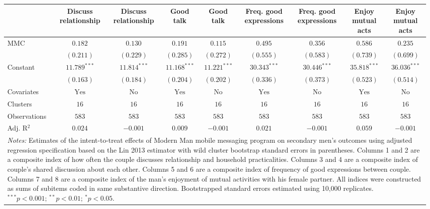 
\begin{tabular}{l c c c c c c c c}
\toprule
 & Discuss relationship & Discuss relationship & Good talk & Good talk & Freq. good expressions & Freq. good expressions & Enjoy mutual acts & Enjoy mutual acts \\
\midrule
MMC          & $0.182$        & $0.130$        & $0.191$        & $0.115$        & $0.495$        & $0.356$        & $0.586$        & $0.235$        \\
             & $(0.211)$      & $(0.229)$      & $(0.285)$      & $(0.272)$      & $(0.555)$      & $(0.583)$      & $(0.739)$      & $(0.699)$      \\
Constant     & $11.789^{***}$ & $11.814^{***}$ & $11.168^{***}$ & $11.221^{***}$ & $30.343^{***}$ & $30.446^{***}$ & $35.818^{***}$ & $36.036^{***}$ \\
             & $(0.163)$      & $(0.184)$      & $(0.204)$      & $(0.202)$      & $(0.336)$      & $(0.373)$      & $(0.523)$      & $(0.514)$      \\
\midrule
Covariates   & $\textrm{Yes}$ & $\textrm{No}$  & $\textrm{Yes}$ & $\textrm{No}$  & $\textrm{Yes}$ & $\textrm{No}$  & $\textrm{Yes}$ & $\textrm{No}$  \\
Clusters     & $16$           & $16$           & $16$           & $16$           & $16$           & $16$           & $16$           & $16$           \\
Observations & $583$          & $583$          & $583$          & $583$          & $583$          & $583$          & $583$          & $583$          \\
Adj. R$^2$   & $0.024$        & $-0.001$       & $0.009$        & $-0.001$       & $0.021$        & $-0.001$       & $0.059$        & $-0.001$       \\
\bottomrule
\multicolumn{9}{l}{\scriptsize{\parbox{\linewidth}{\vspace{2pt}
       \textit{Notes:} Estimates of the intent-to-treat effects of Modern Man mobile
       messaging program on secondary men's outcomes using adjusted regression
       specification based on the Lin 2013 estimator with wild cluster bootstrap
       standard errors in parentheses. Columns 1 and 2 are a composite index of
       how often the couple discusses relationship and household practicalities. 
       Columns 3 and 4 are a composite index of couple's shared discussion about each other.
       Columns 5 and 6 are a composite index of frequency of good expressions between couple.
       Columns 7 and 8 are a composite index of the man's enjoyment of mutual activities with 
       his female partner. All indices were constructed as sums of subitems coded in
       same substantive direction. Bootstrapped standard errors estimated using 10,000 
       replicates. \\ $^{***}p<0.001$; $^{**}p<0.01$; $^{*}p<0.05$.}}}
\end{tabular}

